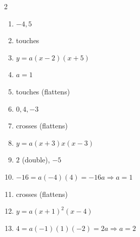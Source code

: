 \documentclass[11pt]{article}
\begin{document}
\begin{keybox}
\begin{multicols}{2}
\small
\begin{enumerate}[leftmargin=*,itemsep=3pt]
  \item $-4,5$
  \item touches
  \item $y=a(x-2)(x+5)$
  \item $a=1$
  \item touches (flattens)
  \item $0,4,-3$
  \item crosses (flattens)
  \item $y=a(x+3)x(x-3)$
  \item $2$ (double), $-5$
  \item $-16=a(-4)(4)=-16a\Rightarrow a=1$
  \item crosses (flattens)
  \item $y=a(x+1)^2(x-4)$
  \item $4=a(-1)(1)(-2)=2a\Rightarrow a=2$
\end{enumerate}
\end{multicols}
\end{keybox}
\end{document}
